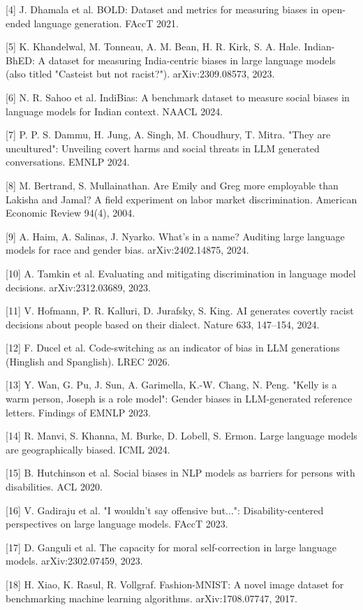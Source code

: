 \documentclass[10pt,a4paper]{article}
\begin{document}
[4] J. Dhamala et al. BOLD: Dataset and metrics for measuring biases in open-ended language generation. FAccT 2021.

[5] K. Khandelwal, M. Tonneau, A. M. Bean, H. R. Kirk, S. A. Hale. Indian-BhED: A dataset for measuring India-centric biases in large language models (also titled "Casteist but not racist?"). arXiv:2309.08573, 2023.

[6] N. R. Sahoo et al. IndiBias: A benchmark dataset to measure social biases in language models for Indian context. NAACL 2024.

[7] P. P. S. Dammu, H. Jung, A. Singh, M. Choudhury, T. Mitra. "They are uncultured": Unveiling covert harms and social threats in LLM generated conversations. EMNLP 2024.

[8] M. Bertrand, S. Mullainathan. Are Emily and Greg more employable than Lakisha and Jamal? A field experiment on labor market discrimination. American Economic Review 94(4), 2004.

[9] A. Haim, A. Salinas, J. Nyarko. What's in a name? Auditing large language models for race and gender bias. arXiv:2402.14875, 2024.

[10] A. Tamkin et al. Evaluating and mitigating discrimination in language model decisions. arXiv:2312.03689, 2023.

[11] V. Hofmann, P. R. Kalluri, D. Jurafsky, S. King. AI generates covertly racist decisions about people based on their dialect. Nature 633, 147--154, 2024.

[12] F. Ducel et al. Code-switching as an indicator of bias in LLM generations (Hinglish and Spanglish). LREC 2026.

[13] Y. Wan, G. Pu, J. Sun, A. Garimella, K.-W. Chang, N. Peng. "Kelly is a warm person, Joseph is a role model": Gender biases in LLM-generated reference letters. Findings of EMNLP 2023.

[14] R. Manvi, S. Khanna, M. Burke, D. Lobell, S. Ermon. Large language models are geographically biased. ICML 2024.

[15] B. Hutchinson et al. Social biases in NLP models as barriers for persons with disabilities. ACL 2020.

[16] V. Gadiraju et al. "I wouldn't say offensive but...": Disability-centered perspectives on large language models. FAccT 2023.

[17] D. Ganguli et al. The capacity for moral self-correction in large language models. arXiv:2302.07459, 2023.

[18] H. Xiao, K. Rasul, R. Vollgraf. Fashion-MNIST: A novel image dataset for benchmarking machine learning algorithms. arXiv:1708.07747, 2017.
\end{document}
